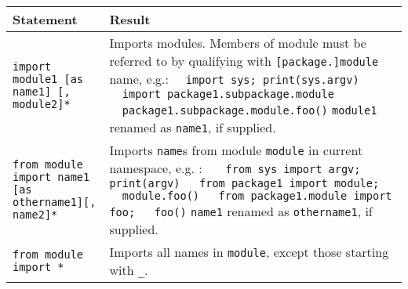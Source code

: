 \begin{longtable}{|p{5.5cm}|p{9.5cm}|}
\hline
\bf Statement & \bf Result \\
\hline
{\tt import module1 [as name1] [, module2]*} 	& Imports modules. 
	Members of module must be referred to by qualifying with {\tt [package.]module} name, e.g.:\newline
	{\tt \mbox{}\ \ import sys; print(sys.argv)\newline
	\mbox{}\ \ import package1.subpackage.module\newline
	\mbox{}\ \ package1.subpackage.module.foo()}\newline
	{\tt module1} renamed as {\tt name1}, if supplied.\\
\hline
{\tt \tt from module import name1 [as othername1][, name2]*} 	& Imports {\tt name}s from module {\tt module} 
	in current namespace, e.g. :\newline
{\tt 
\mbox{}\ \ from sys import argv; print(argv)\newline
\mbox{}\ \ from package1 import module; \newline\mbox{}\ \ module.foo()\newline
\mbox{}\ \ from package1.module import foo; \newline\mbox{}\ \ foo()}\newline
{\tt name1} renamed as {\tt othername1}, if supplied.\\
\hline
{\tt from module import * } 	 & Imports all names in {\tt module}, except those starting with {\tt \_}. \\
\hline
\end{longtable}



